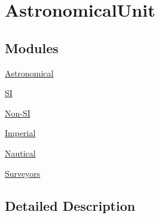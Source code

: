 \hypertarget{group___e_g_x_math-_conversions-_length_conversions-_astronomical-_astronomical_unit}{}\section{Astronomical\+Unit}
\label{group___e_g_x_math-_conversions-_length_conversions-_astronomical-_astronomical_unit}
\subsection*{Modules}
\begin{DoxyCompactItemize}
\item 
\mbox{\hyperlink{group___e_g_x_math-_conversions-_length_conversions-_astronomical-_astronomical_unit-_astronomical}{Astronomical}}
\item 
\mbox{\hyperlink{group___e_g_x_math-_conversions-_length_conversions-_astronomical-_astronomical_unit-_s_i}{SI}}
\item 
\mbox{\hyperlink{group___e_g_x_math-_conversions-_length_conversions-_astronomical-_astronomical_unit-_non-_s_i}{Non-\/\+SI}}
\item 
\mbox{\hyperlink{group___e_g_x_math-_conversions-_length_conversions-_astronomical-_astronomical_unit-_imperial}{Imperial}}
\item 
\mbox{\hyperlink{group___e_g_x_math-_conversions-_length_conversions-_astronomical-_astronomical_unit-_nautical}{Nautical}}
\item 
\mbox{\hyperlink{group___e_g_x_math-_conversions-_length_conversions-_astronomical-_astronomical_unit-_surveyors}{Surveyors}}
\end{DoxyCompactItemize}


\subsection{Detailed Description}
